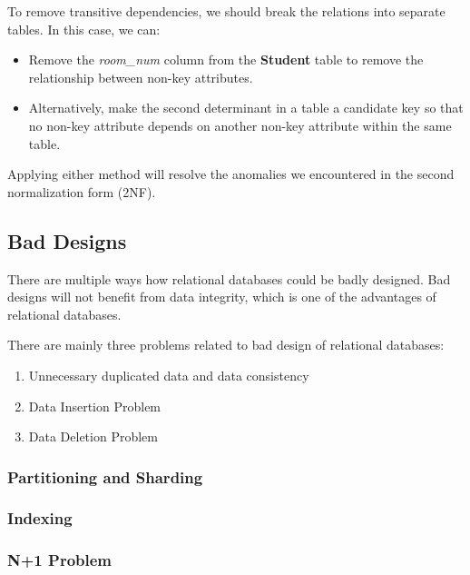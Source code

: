 To remove transitive dependencies, we should break the relations into separate tables. In this case, we can:

\begin{itemize}
    \item Remove the \textit{room\_num} column from the \textbf{Student} table to remove the relationship between non-key attributes.
    \item Alternatively, make the second determinant in a table a candidate key so that no non-key attribute depends on another non-key attribute within the same table.
\end{itemize}

Applying either method will resolve the anomalies we encountered in the second normalization form (2NF).



\subsection[Bad Designs]{Bad Designs}
There are multiple ways how relational databases could be badly designed. Bad designs will not benefit from data integrity, 
which is one of the advantages of relational databases. 

There are mainly three problems related to bad design of relational databases:
\begin{enumerate}
    \item Unnecessary duplicated data and data consistency
    \item Data Insertion Problem
    \item Data Deletion Problem
\end{enumerate}

\subsubsection[Partitioning and Sharding]{Partitioning and Sharding}

\subsubsection[Indexing]{Indexing}

\subsubsection[N+1 Problem]{N+1 Problem}